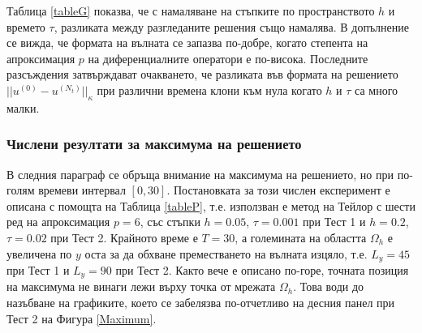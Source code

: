 \documentclass{article}
\theoremstyle{remark}
\begin{document}
\FloatBarrier
Таблица \ref{tableG} показва, че с намаляване на стъпките по пространството $h$ и времето $\tau$, разликата между разгледаните решения също намалява. В допълнение се вижда, че формата на вълната се запазва по-добре, когато степента на апроксимация $p$ на диференциалните оператори е по-висока. Последните разсъждения затвърждават очакването, че разликата във формата на решението $||u^{(0)} - u^{(N_t)}||_\kappa$ при различни времена клони към нула когато $h$ и $\tau$ са много малки.

\subsubsection{Числени резултати за максимума на решението}
В следния параграф се обръща внимание на максимума на решението, но при по-голям времеви интервал $[0, 30]$. Постановката за този числен експеримент е описана с помощта на Таблица \ref{tableP}, т.е. използван е метод на Тейлор с шести ред на апроксимация $p=6$, със стъпки $h=0.05$, $\tau = 0.001$ при Тест 1 и $h=0.2$,  $\tau=0.02$ при Тест 2. Крайното време е $T=30$, а големината на областта $\Omega_h$ е увеличена по $y$ оста за да обхване преместването на вълната изцяло, т.е. $L_y = 45$ при Тест 1 и $L_y = 90$ при Тест 2. Както вече е описано по-горе, точната позиция на максимума не винаги лежи върху точка от мрежата $\Omega_h$. Това води до назъбване на графиките, което се забелязва по-отчетливо на десния панел при Тест 2 на Фигура \ref{Maximum}. 
\end{document}
